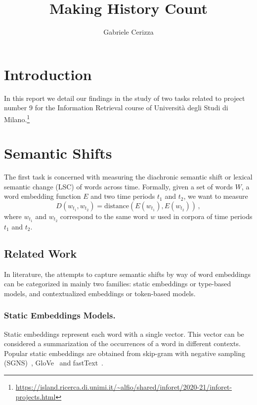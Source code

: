 \documentclass[runningheads]{llncs}
\begin{document}
\title{
    Making History Count
}
\author{Gabriele Cerizza}


\maketitle

\section{Introduction}
\label{sec:introduction}

In this report we detail our findings in the study of two tasks related to project number 9 for the Information Retrieval course of Università degli Studi di Milano.\footnote{\url{https://island.ricerca.di.unimi.it/\~alfio/shared/inforet/2020-21/inforet-projects.html}}

\section{Semantic Shifts}
\label{sec:semantic_shifts}

The first task is concerned with measuring the diachronic semantic shift or lexical semantic change (LSC) of words across time. Formally, given a set of words $W$, a word embedding function $E$ and two time periods $t_1$ and $t_2$, we want to measure
\begin{equation}
    D(w_{t_1}, w_{t_2}) = \text{distance}(E(w_{t_1}), E(w_{t_2})) \,,
\end{equation}
where $w_{t_1}$ and $w_{t_2}$ correspond to the same word $w$ used in corpora of time periods $t_1$ and $t_2$.

\subsection{Related Work}
\label{subsec:semantic_shifts:related_work}

In literature, the attempts to capture semantic shifts by way of word embeddings can be categorized in mainly two families: static embeddings or type-based models, and contextualized embeddings or token-based models.

\subsubsection{Static Embeddings Models.} Static embeddings represent each word with a single vector. This vector can be considered a summarization of the occurrences of a word in different contexts. Popular static embeddings are obtained from skip-gram with negative sampling (SGNS)~\cite{mikolov-etal-2013-word2vec}, GloVe~\cite{pennington-etal-2014-glove} and fastText~\cite{bojanowski-etal-2017-fasttext}.
\end{document}
